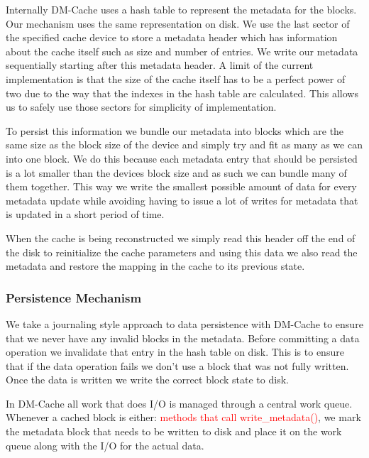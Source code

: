 Internally DM-Cache uses a hash table to represent the metadata for
the blocks. Our mechanism uses the same representation on disk. We use
the last sector of the specified cache device to store a metadata
header which has information about the cache itself such as size and
number of entries. We write our metadata sequentially starting after
this metadata header. A limit of the current implementation is that
the size of the cache itself has to be a perfect power of two due to
the way that the indexes in the hash table are calculated. This allows
us to safely use those sectors for simplicity of implementation.

To persist this information we bundle our metadata into blocks which
are the same size as the block size of the device and simply try and
fit as many as we can into one block. We do this because each metadata
entry that should be persisted is a lot smaller than the devices block
size and as such we can bundle many of them together. This way we
write the smallest possible amount of data for every metadata update
while avoiding having to issue a lot of writes for metadata that is
updated in a short period of time.

When the cache is being reconstructed we simply read this header off
the end of the disk to reinitialize the cache parameters and using
this data we also read the metadata and restore the mapping in the
cache to its previous state.

\subsubsection{Persistence Mechanism}

We take a journaling style approach to data persistence with DM-Cache
to ensure that we never have any invalid blocks in the
metadata. Before committing a data operation we invalidate that entry
in the hash table on disk. This is to ensure that if the data
operation fails we don't use a block that was not fully written. Once
the data is written we write the correct block state to disk.

In DM-Cache all work that does I/O is managed through a central work
queue. Whenever a cached block is either: \textcolor{red}{methods that
  call write\_metadata()}, we mark the metadata block that needs to be
written to disk and place it on the work queue along with the I/O for
the actual data.
